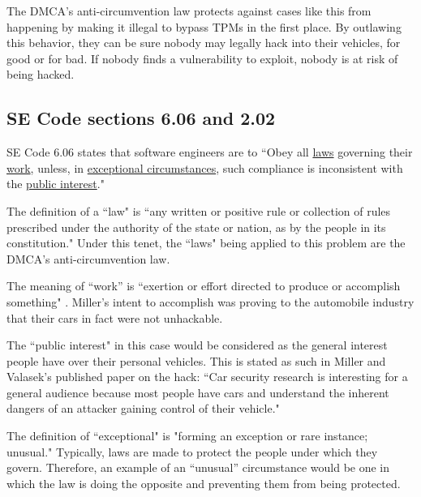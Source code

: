\documentclass[12pt]{article}
\begin{document}
\begin{multicols}{2}
The DMCA's anti-circumvention law protects against cases like this from happening by making it illegal to bypass TPMs in the first place.\cite{DMCA} By outlawing this behavior, they can be sure nobody may legally hack into their vehicles, for good or for bad. If nobody finds a vulnerability to exploit, nobody is at risk of being hacked.




\subsection{SE Code sections 6.06 and 2.02}
SE Code 6.06 states that software engineers are to ``Obey all \underline{laws} governing their \underline{work}, unless, in \underline{exceptional circumstances}, such compliance is inconsistent with the \underline{public interest}."\cite{seCode}

The definition of a ``law" is ``any written or positive rule or collection of rules prescribed under the authority of the state or nation, as by the people in its constitution."\cite{dictionary} Under this tenet, the ``laws" being applied to this problem are the DMCA's anti-circumvention law. 





The meaning of ``work'' is ``exertion or effort directed to produce or accomplish something" \cite{dictionary}. Miller's intent to accomplish was proving to the automobile industry that their cars in fact were not unhackable. \cite{youtube}

The ``public interest" in this case would be considered as the general interest people have over their personal vehicles. This is stated as such in Miller and Valasek's published paper on the hack: ``Car security research is interesting for a general audience because most people have cars and understand the inherent dangers of an attacker gaining control of their vehicle." \cite{officialPaper}

The definition of ``exceptional" is "forming an exception or rare instance; unusual." \cite{dictionary} Typically, laws are made to protect the people under which they govern. Therefore, an example of an ``unusual'' circumstance would be one in which the law is doing the opposite and preventing them from being protected.


\end{multicols}
\end{document}
